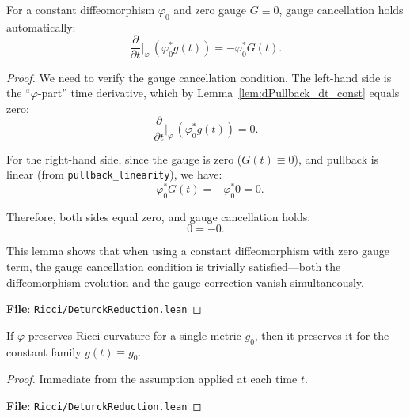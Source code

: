 \begin{lemma}
\label{lem:gaugeCancellationOn_const_zero}
\leanok
{}
For a constant diffeomorphism $\varphi_0$ and zero gauge $G \equiv 0$, gauge cancellation holds automatically:
\[
\frac{\partial}{\partial t}\big|_{\varphi}\, (\varphi_0^* g(t)) = -\varphi_0^* G(t).
\]
\end{lemma}

\begin{proof}
\leanok
{}
We need to verify the gauge cancellation condition. The left-hand side is the ``$\varphi$-part'' time derivative, which by Lemma~\ref{lem:dPullback_dt_const} equals zero:
\[
\frac{\partial}{\partial t}\big|_{\varphi}\, (\varphi_0^* g(t)) = 0.
\]

For the right-hand side, since the gauge is zero ($G(t) \equiv 0$), and pullback is linear (from \texttt{pullback\_linearity}), we have:
\[
-\varphi_0^* G(t) = -\varphi_0^* 0 = 0.
\]

Therefore, both sides equal zero, and gauge cancellation holds:
\[
0 = -0.
\]

This lemma shows that when using a constant diffeomorphism with zero gauge term, the gauge cancellation condition is trivially satisfied—both the diffeomorphism evolution and the gauge correction vanish simultaneously.

\textbf{File}: \texttt{Ricci/DeturckReduction.lean}
\end{proof}

\begin{lemma}
\label{lem:ricciNaturalityOn_const_single}
\leanok
{}
If $\varphi$ preserves Ricci curvature for a single metric $g_0$, then it preserves it for the constant family $g(t) \equiv g_0$.
\end{lemma}

\begin{proof}
\leanok
{}
Immediate from the assumption applied at each time $t$.

\textbf{File}: \texttt{Ricci/DeturckReduction.lean}
\end{proof}


